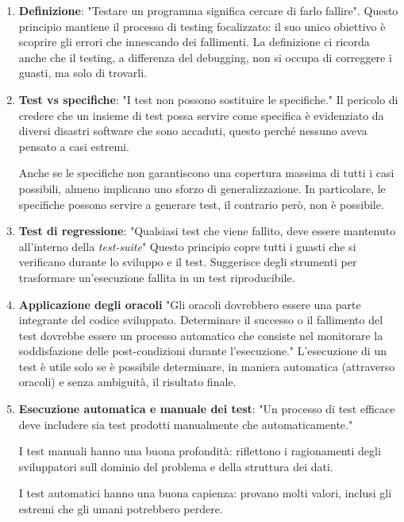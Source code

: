 \begin{enumerate}
\item \textbf{Definizione}: "Testare un programma significa cercare di farlo fallire". Questo principio mantiene il processo di testing focalizzato: il suo unico obiettivo è scoprire gli errori che innescando dei fallimenti. La definizione ci ricorda anche che il testing, a differenza del debugging, non si occupa di correggere i guasti, ma solo di trovarli.

\item \textbf{Test vs specifiche}: "I test non possono sostituire le specifiche." Il pericolo di credere che un insieme di test possa servire come specifica è evidenziato da diversi disastri software che sono accaduti, questo perché nessuno aveva pensato a casi estremi. 

Anche se le specifiche non garantiscono una copertura massima di tutti i casi possibili, almeno implicano uno sforzo di generalizzazione. In particolare, le specifiche possono servire a generare test, il contrario però, non è possibile.

\item \textbf{Test di regressione}:  "Qualsiasi test che viene fallito, deve essere mantenuto all'interno della \textit{test-suite}" Questo principio copre tutti i guasti che si verificano durante lo sviluppo e il test. Suggerisce degli strumenti per trasformare un'esecuzione fallita in un test riproducibile.

\item \textbf{Applicazione degli oracoli}  "Gli oracoli dovrebbero essere una parte integrante del codice sviluppato. Determinare il successo o il fallimento del test dovrebbe essere un processo automatico che consiste nel monitorare la soddisfazione delle post-condizioni durante l'esecuzione." L'esecuzione di un test è utile solo se è possibile determinare, in maniera automatica (attraverso oracoli) e senza ambiguità, il risultato finale.

\item \textbf{Esecuzione automatica e manuale dei test}:  "Un processo di test efficace deve includere sia test prodotti manualmente che automaticamente." 

I test manuali hanno una buona profondità: riflettono i ragionamenti degli sviluppatori sull dominio del problema e della struttura dei dati. 

I test automatici hanno una buona capienza: provano molti valori, inclusi gli estremi che gli umani potrebbero perdere.


\end{enumerate}
